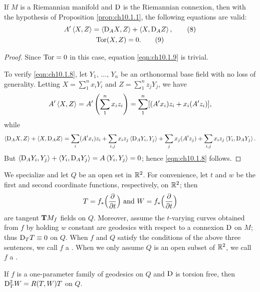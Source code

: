 \documentclass[../main]{subfiles}
\begin{document}
\begin{proposition} \label{prop:ch10.1.3}
If $M$ is a Riemannian manifold and $\mathrm{D}$ is the Riemannian connexion, then with the hypothesis of Proposition \eqref{prop:ch10.1.1}, the following equations are valid:
    \begin{gather}
    A' \left\langle X,Z\right\rangle = \left\langle\mathrm{D}_A X,Z\right\rangle+\left\langle X,\mathrm{D}_A Z\right\rangle,
    \label{eqn:ch10.1.8}\tag{8} \\
    \mathrm{Tor}(X,Z)=0.
    \label{eqn:ch10.1.9}\tag{9}
    \end{gather}
\end{proposition}

\begin{proof}
Since $\mathrm{Tor}=0$ in this case, equation \eqref{eqn:ch10.1.9} is trivial.

To verify \eqref{eqn:ch10.1.8}, let $Y_1,\, \hdots,\, Y_n$ be an orthonormal base field with no loss of generality. Letting $X=\displaystyle\sum_1^n x_i Y_i$ and $Z=\displaystyle\sum_1^n z_j Y_j$, we have
\[
A'\left\langle X,Z\right\rangle
=
A'\left( \sum_1^n x_iz_i \right)
=
\sum_1^n [(A'x_i)z_i+x_i(A'z_i)],
\]
while
\[
\left\langle\mathrm{D}_A X,Z\right\rangle+\left\langle X,\mathrm{D}_A Z\right\rangle
=
\sum_i (A' x_i) z_i
    + \sum_{i,j} x_iz_j \left\langle\mathrm{D}_A Y_i,Y_j\right\rangle
    + \sum_j x_j(A'z_j)
    + \sum_{i,j} x_iz_j \left\langle Y_i,\mathrm{D}_A Y_j\right\rangle.
\]
But $\left\langle\mathrm{D}_A Y_i,Y_j\right\rangle+\left\langle Y_i,\mathrm{D}_A Y_j\right\rangle=A\left\langle Y_i,Y_j\right\rangle=0$; hence \eqref{eqn:ch10.1.8} follows.
\end{proof}



We specialize and let $Q$ be an open set in $\mathbb{R}^2$. For convenience, let $t$ and $w$ be the first and second coordinate functions, respectively, on $\mathbb{R}^2$; then \[T=f_\ast\Big(\dfrac{\partial }{\partial t}\Big)\text{ and } W=f_\ast\Big(\dfrac{\partial }{\partial t}\Big)\] are tangent $\mathbf{T}M_f$ fields on $Q$. Moreover, assume the $t$-varying curves obtained from $f$ by holding $w$ constant are geodesics with respect to a connexion $\mathrm{D}$ on $M$; thus $\mathrm{D}_T T \equiv 0$ on $Q$. When $f$ and $Q$ satisfy the conditions of the above three sentences, we call $f$ a . When we only assume $Q$ is an open subset of $\mathbb{R}^2$, we call $f$ a .



\begin{theorem} \label{thm:ch10.1.4}
If $f$ is a one-parameter family of geodesics on $Q$ and $\mathrm{D}$ is torsion free, then $\mathrm{D}_T^2 W = R(T,W)T$ on $Q$.
\end{theorem}
\end{document}
